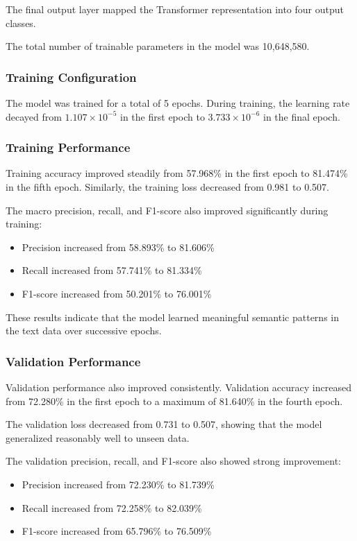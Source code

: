 \documentclass[10pt,a4paper,twocolumn]{article}
\begin{document}
The final output layer mapped the Transformer representation into four output classes.

The total number of trainable parameters in the model was 10,648,580.

\subsubsection{Training Configuration}

The model was trained for a total of 5 epochs. During training, the learning rate decayed from $1.107 \times 10^{-5}$ in the first epoch to $3.733 \times 10^{-6}$ in the final epoch.

\subsubsection{Training Performance}

Training accuracy improved steadily from 57.968\% in the first epoch to 81.474\% in the fifth epoch. Similarly, the training loss decreased from 0.981 to 0.507.

The macro precision, recall, and F1-score also improved significantly during training:

\begin{itemize}
    \item Precision increased from 58.893\% to 81.606\%
    \item Recall increased from 57.741\% to 81.334\%
    \item F1-score increased from 50.201\% to 76.001\%
\end{itemize}

These results indicate that the model learned meaningful semantic patterns in the text data over successive epochs.

\subsubsection{Validation Performance}

Validation performance also improved consistently. Validation accuracy increased from 72.280\% in the first epoch to a maximum of 81.640\% in the fourth epoch.

The validation loss decreased from 0.731 to 0.507, showing that the model generalized reasonably well to unseen data.

The validation precision, recall, and F1-score also showed strong improvement:

\begin{itemize}
    \item Precision increased from 72.230\% to 81.739\%
    \item Recall increased from 72.258\% to 82.039\%
    \item F1-score increased from 65.796\% to 76.509\%
\end{itemize}
\end{document}

